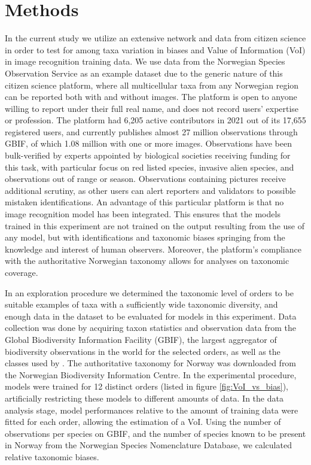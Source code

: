 \documentclass{article}
\begin{document}
\section*{Methods}
In the current study we utilize an extensive network and data from citizen science in order to test for among taxa variation in biases and Value of Information (VoI) in image recognition training data. We use data from the Norwegian Species Observation Service as an example dataset due to the generic nature of this citizen science platform, where all multicellular taxa from any Norwegian region can be reported both with and without images. The platform is open to anyone willing to report under their full real name, and does not record users' expertise or profession. The platform had 6,205 active contributors in 2021 out of its 17,655 registered users, and currently publishes almost 27 million observations through GBIF, of which 1.08 million with one or more images. Observations have been bulk-verified by experts appointed by biological societies receiving funding for this task, with particular focus on red listed species, invasive alien species, and observations out of range or season. Observations containing pictures receive additional scrutiny, as other users can alert reporters and validators to possible mistaken identifications. An advantage of this particular platform is that no image recognition model has been integrated. This ensures that the models trained in this experiment are not trained on the output resulting from the use of any model, but with identifications and taxonomic biases springing from the knowledge and interest of human observers. Moreover, the platform's compliance with the authoritative Norwegian taxonomy allows for analyses on taxonomic coverage.

In an exploration procedure we determined the taxonomic level of orders to be suitable examples of taxa with a sufficiently wide taxonomic diversity, and enough data in the dataset to be evaluated for models in this experiment. Data collection was done by acquiring taxon statistics and observation data from the Global Biodiversity Information Facility (GBIF), the largest aggregator of biodiversity observations in the world\autocite{GBIFhomepage} for the selected orders, as well as the classes used by \citeauthor{Troudet2017}\autocite{Troudet2017}. The authoritative taxonomy for Norway was downloaded from the Norwegian Biodiversity Information Centre\autocite{Artsnavnebase}. In the experimental procedure, models were trained for 12 distinct orders (listed in figure \ref{fig:VoI_vs_bias}), artificially restricting these models to different amounts of data. In the data analysis stage, model performances relative to the amount of training data were fitted for each order, allowing the estimation of a VoI. Using the number of observations per species on GBIF, and the number of species known to be present in Norway from the Norwegian Species Nomenclature Database, we calculated relative taxonomic biases.
\end{document}

